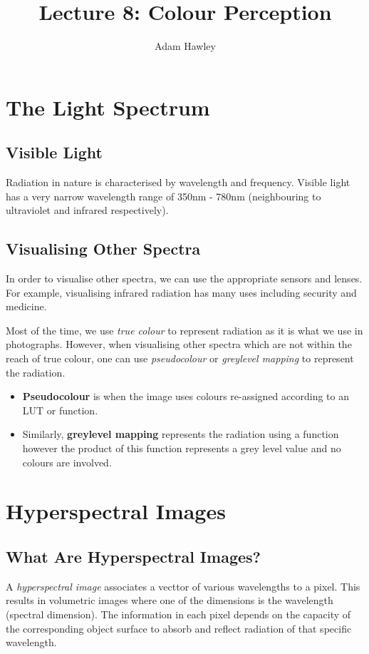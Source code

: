 \documentclass{article}
\author{Adam Hawley}
\title{Lecture 8: Colour Perception}
\begin{document}
\maketitle

\section{The Light Spectrum}
\subsection{Visible Light}
Radiation in nature is characterised by wavelength and frequency.
Visible light has a very narrow wavelength range of 350nm - 780nm (neighbouring to ultraviolet and infrared respectively).

\subsection{Visualising Other Spectra}
In order to visualise other spectra, we can use the appropriate sensors and lenses.
For example, visualising infrared radiation has many uses including security and medicine.

Most of the time, we use {\it true colour} to represent radiation as it is what we use in photographs.
However, when visualising other spectra which are not within the reach of true colour, one can use {\it pseudocolour} or {\it greylevel mapping} to represent the radiation.
\begin{itemize}
	\item {\bf Pseudocolour} is when the image uses colours re-assigned according to an LUT or function.
	\item Similarly, {\bf greylevel mapping} represents the radiation using a function however the product of this function represents a grey level value and no colours are involved.
\end{itemize}

\section{Hyperspectral Images}
\subsection{What Are Hyperspectral Images?}
A {\it hyperspectral image} associates a vecttor of various wavelengths to a pixel.
This results in volumetric images where one of the dimensions is the wavelength (spectral dimension).
The information in each pixel depends on the capacity of the corresponding object surface to absorb and reflect radiation of that specific wavelength.
\end{document}
